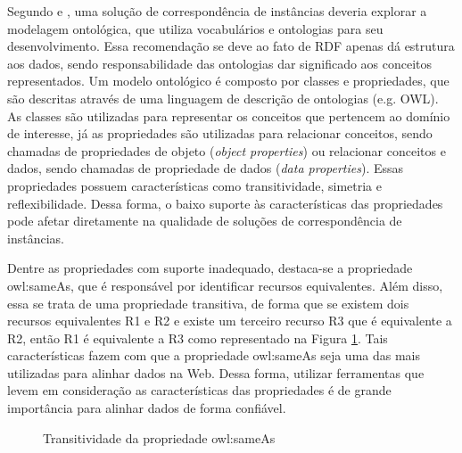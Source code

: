 Segundo \cite{homoceanu2014putting} e \cite{ferrara2008towards}, uma solução de correspondência de instâncias deveria explorar a modelagem ontológica, que utiliza vocabulários e ontologias para seu desenvolvimento. Essa recomendação se deve ao fato de RDF apenas dá estrutura aos dados, sendo responsabilidade das ontologias dar significado aos conceitos representados. Um modelo ontológico é composto por classes e propriedades, que são descritas através de uma linguagem de descrição de ontologias (e.g. OWL). As classes são utilizadas para representar os conceitos que pertencem ao domínio de interesse, já as propriedades são utilizadas para relacionar conceitos, sendo chamadas de propriedades de objeto (\textit{object properties}) ou relacionar conceitos e dados, sendo chamadas de propriedade de dados (\textit{data properties}). Essas propriedades possuem características como transitividade, simetria e reflexibilidade. Dessa forma, o baixo suporte às características das propriedades pode afetar diretamente na qualidade de soluções de correspondência de instâncias. 
        
Dentre as propriedades com suporte inadequado,  destaca-se a propriedade owl:sameAs, que é responsável por identificar recursos equivalentes. Além disso, essa se trata de uma propriedade transitiva, de forma que se existem dois recursos equivalentes R1 e R2 e existe um terceiro recurso R3 que é equivalente a R2, então R1 é equivalente a R3 como representado na Figura \ref{sameAsSample}. Tais características fazem com que a propriedade owl:sameAs seja uma das  mais utilizadas para alinhar dados na Web. Dessa forma, utilizar ferramentas que levem em consideração as características das propriedades é de grande importância para alinhar dados de forma confiável.


\begin{figure}[h]
	\centering
		\caption{Transitividade da propriedade owl:sameAs}
		\label{sameAsSample}
\end{figure}



